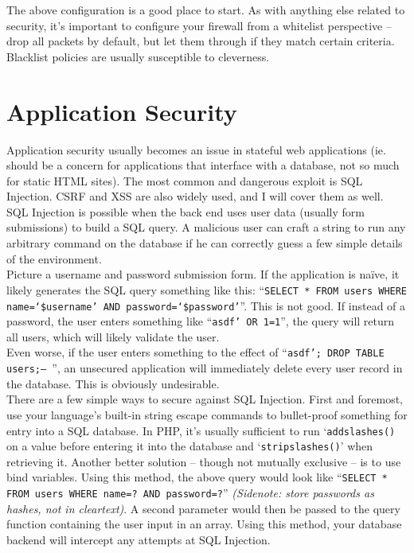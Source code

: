 \documentclass[10pt,letterpaper,titlepage]{article}
\begin{document}
\noindent The above configuration is a good place to start. As with anything else related to security, it's important to configure your firewall from a whitelist perspective -- drop all packets by default, but let them through if they match certain criteria. Blacklist policies are usually susceptible to cleverness.

\section*{Application Security}
\noindent Application security usually becomes an issue in stateful web applications (ie. should be a concern for applications that interface with a database, not so much for static HTML sites). The most common and dangerous exploit is SQL Injection. CSRF and XSS are also widely used, and I will cover them as well.
\\

\noindent SQL Injection is possible when the back end uses user data (usually form submissions) to build a SQL query.  A malicious user can craft a string to run any arbitrary command on the database if he can correctly guess a few simple details of the environment.
\\

\noindent Picture a username and password submission form. If the application is na\"{i}ve, it likely generates the SQL query something like this: ``\texttt{SELECT * FROM users WHERE name=`\$username' AND password=`\$password'}''. This is not good.\cite{sql} If instead of a password, the user enters something like ``\texttt{asdf' OR 1=1}'', the query will return all users, which will likely validate the user.
\\

\noindent Even worse, if the user enters something to the effect of ``\texttt{asdf'; DROP TABLE users;-- }'', an unsecured application will immediately delete every user record in the database. This is obviously undesirable.
\\

\noindent There are a few simple ways to secure against SQL Injection. First and foremost, use your language's built-in string escape commands to bullet-proof something for entry into a SQL database. In PHP, it's usually sufficient to run `\texttt{addslashes()} on a value before entering it into the database and `\texttt{stripslashes()}' when retrieving it. Another better solution -- though not mutually exclusive -- is to use bind variables. Using this method, the above query would look like ``\texttt{SELECT * FROM users WHERE name=? AND password=?}'' \textit{(Sidenote: store passwords as hashes, not in cleartext)}. A second parameter would then be passed to the query function containing the user input in an array. Using this method, your database backend will intercept any attempts at SQL Injection.
\\
\end{document}
